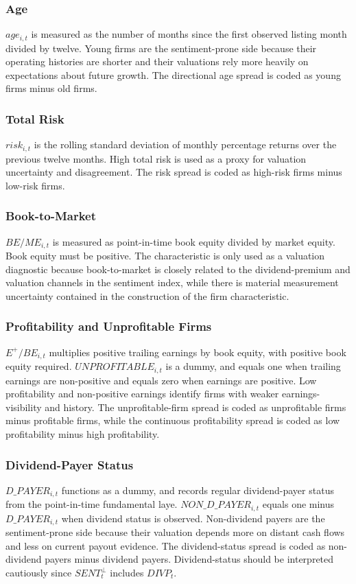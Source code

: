 \documentclass[11pt]{article}
\newcommand{\var}[1]{\ensuremath{#1}}
\begin{document}
\subsubsection{Age}
\var{age_{i,t}} is measured as the number of months since the first observed listing month divided by twelve. Young firms are the sentiment-prone side because their operating histories are shorter and their valuations rely more heavily on expectations about future growth. The directional age spread is coded as young firms minus old firms.

\subsubsection{Total Risk}
\var{risk_{i,t}} is the rolling standard deviation of monthly percentage returns over the previous twelve months. High total risk is used as a proxy for valuation uncertainty and disagreement. The risk spread is coded as high-risk firms minus low-risk firms.

\subsubsection{Book-to-Market}
\var{BE/ME_{i,t}} is measured as point-in-time book equity divided by market equity. Book equity must be positive. The characteristic is only used as a valuation diagnostic because book-to-market is closely related to the dividend-premium and valuation channels in the sentiment index, while there is material measurement uncertainty contained in the construction of the firm characteristic.

\subsubsection{Profitability and Unprofitable Firms}
\var{E^+/BE_{i,t}} multiplies positive trailing earnings by book equity, with positive book equity required. \var{UNPROFITABLE_{i,t}} is a dummy, and equals one when trailing earnings are non-positive and equals zero when earnings are positive. Low profitability and non-positive earnings identify firms with weaker earnings-visibility and history. The unprofitable-firm spread is coded as unprofitable firms minus profitable firms, while the continuous profitability spread is coded as low profitability minus high profitability.

\subsubsection{Dividend-Payer Status}
\var{D\_PAYER_{i,t}} functions as a dummy, and records regular dividend-payer status from the point-in-time fundamental laye. \var{NON\_D\_PAYER_{i,t}} equals one minus \var{D\_PAYER_{i,t}} when dividend status is observed. Non-dividend payers are the sentiment-prone side because their valuation depends more on distant cash flows and less on current payout evidence. The dividend-status spread is coded as non-dividend payers minus dividend payers. Dividend-status should be interpreted cautiously since \var{SENT^{\perp}_{t}} includes \var{DIVP_t}.
\end{document}
